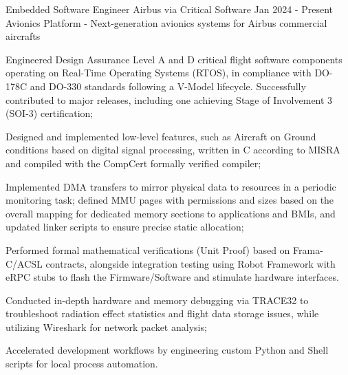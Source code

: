 

\begin{cventries}

  \cventry
    {Embedded Software Engineer} %
    {Airbus via Critical Software} %
    {} %
    {Jan 2024 - Present} %
    {Avionics Platform - Next-generation avionics systems for Airbus commercial aircrafts} %
    {
    \begin{cvitems} %
	\item {Engineered Design Assurance Level A and D critical flight software components operating on Real-Time Operating Systems (RTOS), in compliance with DO-178C and DO-330 standards following a V-Model lifecycle. Successfully contributed to major releases, including one achieving Stage of Involvement 3 (SOI-3) certification;}
	\item {Designed and implemented low-level features, such as Aircraft on Ground conditions based on digital signal processing, written in C according to MISRA and compiled with the CompCert formally verified compiler;}
	\item {Implemented DMA transfers to mirror physical data to resources in a periodic monitoring task; defined MMU pages with permissions and sizes based on the overall mapping for dedicated memory sections to applications and BMIs, and updated linker scripts to ensure precise static allocation;}
	\item {Performed formal mathematical verifications (Unit Proof) based on Frama-C/ACSL contracts, alongside integration testing using Robot Framework with eRPC stubs to flash the Firmware/Software and stimulate hardware interfaces.}
	\item {Conducted in-depth hardware and memory debugging via TRACE32 to troubleshoot radiation effect statistics and flight data storage issues, while utilizing Wireshark for network packet analysis;}
	\item {Accelerated development workflows by engineering custom Python and Shell scripts for local process automation.}
      \end{cvitems}
    }


\end{cventries}
